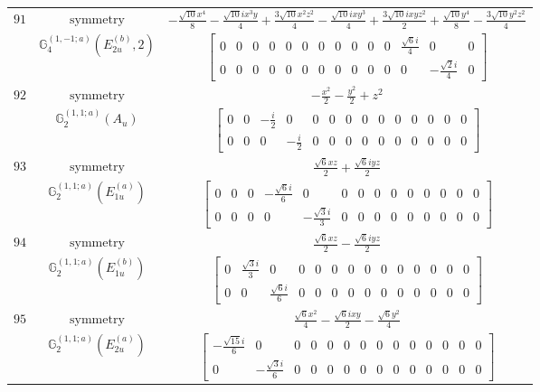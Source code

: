 \documentclass[fleqn,8pt,landscape]{jsarticle}
\begin{document}
\begin{longtable}{ccc}
$ 91 $ & $ \text{symmetry} $ & $ - \frac{\sqrt{10} x^{4}}{8} - \frac{\sqrt{10} i x^{3} y}{4} + \frac{3 \sqrt{10} x^{2} z^{2}}{4} - \frac{\sqrt{10} i x y^{3}}{4} + \frac{3 \sqrt{10} i x y z^{2}}{2} + \frac{\sqrt{10} y^{4}}{8} - \frac{3 \sqrt{10} y^{2} z^{2}}{4} $ \\
$  $ & $ \mathbb{G}_{4}^{(1,-1;a)}(E_{2u}^{(b)},2) $ & $ \begin{bmatrix} 0 & 0 & 0 & 0 & 0 & 0 & 0 & 0 & 0 & 0 & 0 & \frac{\sqrt{6} i}{4} & 0 & 0 \\ 0 & 0 & 0 & 0 & 0 & 0 & 0 & 0 & 0 & 0 & 0 & 0 & - \frac{\sqrt{2} i}{4} & 0 \end{bmatrix} $ \\ \hline
$ 92 $ & $ \text{symmetry} $ & $ - \frac{x^{2}}{2} - \frac{y^{2}}{2} + z^{2} $ \\
$  $ & $ \mathbb{G}_{2}^{(1,1;a)}(A_{u}) $ & $ \begin{bmatrix} 0 & 0 & - \frac{i}{2} & 0 & 0 & 0 & 0 & 0 & 0 & 0 & 0 & 0 & 0 & 0 \\ 0 & 0 & 0 & - \frac{i}{2} & 0 & 0 & 0 & 0 & 0 & 0 & 0 & 0 & 0 & 0 \end{bmatrix} $ \\ \hline
$ 93 $ & $ \text{symmetry} $ & $ \frac{\sqrt{6} x z}{2} + \frac{\sqrt{6} i y z}{2} $ \\
$  $ & $ \mathbb{G}_{2}^{(1,1;a)}(E_{1u}^{(a)}) $ & $ \begin{bmatrix} 0 & 0 & 0 & - \frac{\sqrt{6} i}{6} & 0 & 0 & 0 & 0 & 0 & 0 & 0 & 0 & 0 & 0 \\ 0 & 0 & 0 & 0 & - \frac{\sqrt{3} i}{3} & 0 & 0 & 0 & 0 & 0 & 0 & 0 & 0 & 0 \end{bmatrix} $ \\ \hline
$ 94 $ & $ \text{symmetry} $ & $ \frac{\sqrt{6} x z}{2} - \frac{\sqrt{6} i y z}{2} $ \\
$  $ & $ \mathbb{G}_{2}^{(1,1;a)}(E_{1u}^{(b)}) $ & $ \begin{bmatrix} 0 & \frac{\sqrt{3} i}{3} & 0 & 0 & 0 & 0 & 0 & 0 & 0 & 0 & 0 & 0 & 0 & 0 \\ 0 & 0 & \frac{\sqrt{6} i}{6} & 0 & 0 & 0 & 0 & 0 & 0 & 0 & 0 & 0 & 0 & 0 \end{bmatrix} $ \\ \hline
$ 95 $ & $ \text{symmetry} $ & $ \frac{\sqrt{6} x^{2}}{4} - \frac{\sqrt{6} i x y}{2} - \frac{\sqrt{6} y^{2}}{4} $ \\
$  $ & $ \mathbb{G}_{2}^{(1,1;a)}(E_{2u}^{(a)}) $ & $ \begin{bmatrix} - \frac{\sqrt{15} i}{6} & 0 & 0 & 0 & 0 & 0 & 0 & 0 & 0 & 0 & 0 & 0 & 0 & 0 \\ 0 & - \frac{\sqrt{3} i}{6} & 0 & 0 & 0 & 0 & 0 & 0 & 0 & 0 & 0 & 0 & 0 & 0 \end{bmatrix} $ \\ \hline

\end{longtable}
\end{document}
